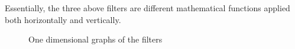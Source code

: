 \documentclass[twoside,a4paper,article]{combine}
\begin{document}
Essentially, the three above filters are different mathematical functions applied both horizontally and vertically.\\
\begin{minipage}{\textwidth}\begin{figure}[H]
    \centering
    \caption{One dimensional graphs of the filters}\label{fig:graph}
\end{figure}\end{minipage}
\end{document}
